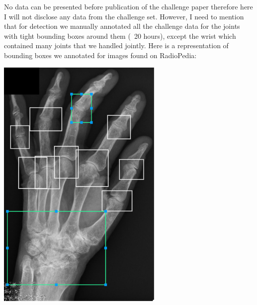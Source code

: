 \documentclass[a4paper,12pt]{article}
\begin{document}
\vspace{4mm}

\par No data can be presented before publication of the challenge paper therefore here I will not disclose any data from the challenge set. However, I need to mention that for detection we manually annotated all the challenge data for the joints with tight bounding boxes around them (~20 hours), except the wrist which contained many joints that we handled jointly. Here is a representation of bounding boxes we annotated for images found on RadioPedia:

\vspace{4mm}

\begin{minipage}[t]{0.42\textwidth}
    \centering
    \includegraphics[width=0.6\textwidth]{ra/ra2-hand-bboxes.png}
    \label{fig:ra2-hand-annot}
\end{minipage}
\end{document}
